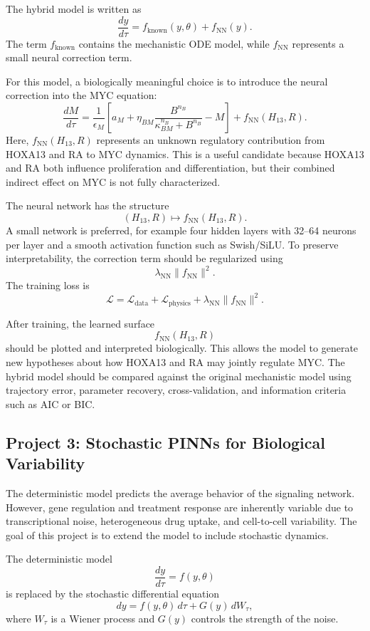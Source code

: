 \documentclass[11pt]{article}
\begin{document}
The hybrid model is written as
\[
\frac{dy}{d\tau}
=
f_{\mathrm{known}}(y,\theta)
+
f_{\mathrm{NN}}(y).
\]
The term $f_{\mathrm{known}}$ contains the mechanistic ODE model, while
$f_{\mathrm{NN}}$ represents a small neural correction term.

For this model, a biologically meaningful choice is to introduce the neural
correction into the MYC equation:
\[
\frac{dM}{d\tau}
=
\frac{1}{\epsilon_M}
\left[
a_M+\eta_{BM}\frac{B^{n_B}}{\kappa_{BM}^{n_B}+B^{n_B}}-M
\right]
+
f_{\mathrm{NN}}(H_{13},R).
\]
Here, $f_{\mathrm{NN}}(H_{13},R)$ represents an unknown regulatory contribution
from HOXA13 and RA to MYC dynamics. This is a useful candidate because HOXA13 and
RA both influence proliferation and differentiation, but their combined indirect
effect on MYC is not fully characterized.

The neural network has the structure
\[
(H_{13},R)\longmapsto f_{\mathrm{NN}}(H_{13},R).
\]
A small network is preferred, for example four hidden layers with 32--64 neurons
per layer and a smooth activation function such as Swish/SiLU. To preserve
interpretability, the correction term should be regularized using
\[
\lambda_{\mathrm{NN}}\|f_{\mathrm{NN}}\|^2.
\]
The training loss is
\[
\mathcal L
=
\mathcal L_{\mathrm{data}}
+
\mathcal L_{\mathrm{physics}}
+
\lambda_{\mathrm{NN}}\|f_{\mathrm{NN}}\|^2.
\]

After training, the learned surface
\[
f_{\mathrm{NN}}(H_{13},R)
\]
should be plotted and interpreted biologically. This allows the model to generate
new hypotheses about how HOXA13 and RA may jointly regulate MYC. The hybrid model
should be compared against the original mechanistic model using trajectory error,
parameter recovery, cross-validation, and information criteria such as AIC or BIC.

\subsection{Project 3: Stochastic PINNs for Biological Variability}

The deterministic model predicts the average behavior of the signaling network.
However, gene regulation and treatment response are inherently variable due to
transcriptional noise, heterogeneous drug uptake, and cell-to-cell variability.
The goal of this project is to extend the model to include stochastic dynamics.

The deterministic model
\[
\frac{dy}{d\tau}=f(y,\theta)
\]
is replaced by the stochastic differential equation
\[
dy=f(y,\theta)\,d\tau+G(y)\,dW_\tau,
\]
where $W_\tau$ is a Wiener process and $G(y)$ controls the strength of the noise.
\end{document}
